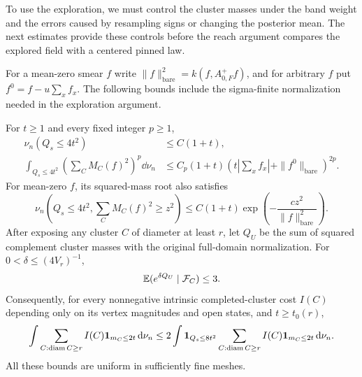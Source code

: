 To use the exploration, we must control the cluster masses under the
band weight and the errors caused by resampling signs or changing the
posterior mean.  The next estimates provide these controls before the
reach argument compares the explored field with a centered pinned law.

For a mean-zero smear $f$ write
$\|f\|_{\mathrm{bare}}^2=k(f,A_{0,F}^{+}f)$, and for arbitrary $f$
put $f^0=f-u\sum_xf_x$.  The following bounds include the
sigma-finite normalization needed in the exploration argument.

\begin{lemma}\label{an:reinsertion}
For $t\ge1$ and every fixed integer $p\ge1$,
\begin{align}
 \nu_n(Q_s\le4t^2)&\le C(1+t),\\
 \int_{Q_s\le4t^2}\left(\sum_CM_C(f)^2\right)^p\dd\nu_n
 &\le C_p(1+t)
       \left(t\left|\sum_xf_x\right|+
                    \|f^0\|_{\mathrm{bare}}\right)^{2p}.
 \label{an:bin-moments}
\end{align}
For mean-zero $f$, its squared-mass root also satisfies
\begin{equation}
 \nu_n\left(Q_s\le4t^2,
                \sum_CM_C(f)^2\ge z^2\right)
 \le C(1+t)\exp\left(-\frac{cz^2}{
                                  \|f\|_{\mathrm{bare}}^2}\right).
 \label{an:bin-tail}
\end{equation}
After exposing any cluster $C$ of diameter at least $r$, let $Q_U$
be the sum of squared complement cluster masses with the original
full-domain normalization.  For $0<\delta\le(4V_r)^{-1}$,
\begin{equation}
 \mathbb E(e^{\delta Q_U}\mid\mathcal F_C)\le3.
 \label{an:conditional-square-tail}
\end{equation}
Consequently, for every nonnegative intrinsic completed-cluster
cost $I(C)$ depending only on its vertex magnitudes and open states,
and $t\ge t_0(r)$,
\begin{equation}
 \int\sum_{C:\operatorname{diam} C\ge r} I(C)\mathbf 1_{m_C\le2t}\,\mathrm d\nu_n
 \le 2\int\mathbf 1_{Q_s\le8t^2}
                 \sum_{C:\operatorname{diam} C\ge r}I(C)
                                      \mathbf 1_{m_C\le2t}\,\mathrm d\nu_n.
 \label{an:reinsertion-bound}
\end{equation}
All these bounds are uniform in sufficiently fine meshes.
\end{lemma}

